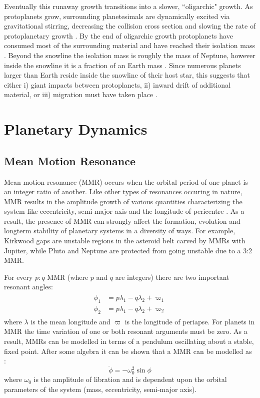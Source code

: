 Eventually this runaway growth transitions into a slower, ``oligarchic" growth. 
As protoplanets grow, surrounding planetesimals are dynamically excited via gravitational stirring, decreasing the collision cross section and slowing the rate of protoplanetary growth \citep{Kokubo1998}.
By the end of oligarchic growth protoplanets have consumed most of the surrounding material and have reached their isolation mass \citep{Schlichting2014}.
Beyond the snowline the isolation mass is roughly the mass of Neptune, however inside the snowline it is a fraction of an Earth mass \citep{Schlichting2014}.
Since numerous \kep planets larger than Earth reside inside the snowline of their host star, this suggests that either i) giant impacts between protoplanets, ii) inward drift of additional material, or iii) migration must have taken place \citep{Schlichting2014}.  

\section{Planetary Dynamics}
\subsection{Mean Motion Resonance}
\label{sec:MMR}
Mean motion resonance (MMR) occurs when the orbital period of one planet is an integer ratio of another. 
Like other types of resonances occuring in nature, MMR results in the amplitude growth of various quantities characterizing the system like eccentricity, semi-major axis and the longitude of pericentre \citep{SSD1999}. 
As a result, the presence of MMR can strongly affect the formation, evolution and longterm stability of planetary systems in a diversity of ways.
For example, Kirkwood gaps are unstable regions in the asteroid belt carved by MMRs with Jupiter, while Pluto and Neptune are protected from going unstable due to a 3:2 MMR. 

For every $p:q$ MMR (where $p$ and $q$ are integers) there are two important resonant angles:
\begin{align}
\begin{split}
\phi_1 &= p\lambda_1 - q\lambda_2 + \varpi_1 \\
\phi_2 &= p\lambda_1 - q\lambda_2 + \varpi_2 
\label{eq:MMR}
\end{split}
\end{align}
where $\lambda$ is the mean longitude and $\varpi$ is the longitude of periapse. 
For planets in MMR the time variation of one or both resonant arguments must be zero.
As a result, MMRs can be modelled in terms of a pendulum oscillating about a stable, fixed point. 
After some algebra it can be shown that a MMR can be modelled as \citep{SSD1999}:
\begin{equation}
\ddot{\phi} = -\omega_0^2 \sin\phi
\label{eq:pendulum}
\end{equation}
where $\omega_0$ is the amplitude of libration and is dependent upon the orbital parameters of the system (mass, eccentricity, semi-major axis).

